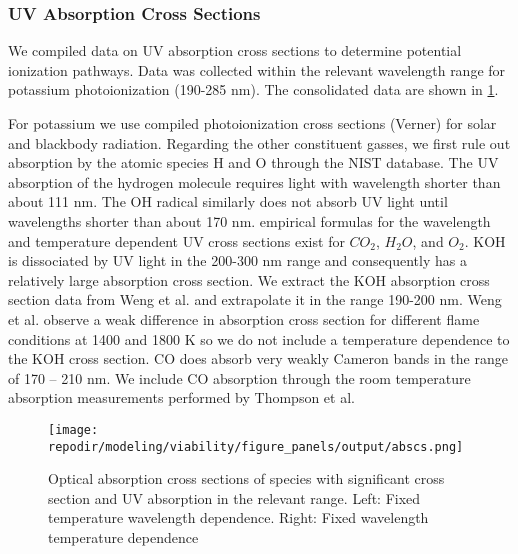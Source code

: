 \subsubsection{UV Absorption Cross Sections}

We compiled data on UV absorption cross sections to determine potential ionization pathways. Data was collected within the relevant wavelength range for potassium photoionization (190-285 nm). The consolidated data are shown in \ref{fig:SI_UV_abscs}.  

For potassium we use compiled photoionization cross sections (Verner) for solar and blackbody radiation.\cite{huebnerPhotoionizationPhotodissociationRates2015} Regarding the other constituent gasses, we first rule out absorption by the atomic species H and O through the NIST database.\cite{sansonettiHandbookBasicAtomic2005} The UV absorption of the hydrogen molecule requires light with wavelength shorter than about 111 nm.\cite{franceFARULTRAVIOLETMOLECULARHYDROGEN} The OH radical similarly does not absorb UV light until wavelengths shorter than about 170 nm.\cite{chipmanAbsorptionSpectrumOH2008} empirical formulas for the wavelength and temperature dependent UV cross sections exist for $CO_2$\cite{oehlschlaegerUltravioletAbsorptionCrosssections2004}, $H_2O$,\cite{zuevUVABSORPTIONCROSS} and $O_2$.\cite{zuevUVABSORPTIONCROSS} KOH is dissociated by UV light in the 200-300 nm range and consequently has a relatively large absorption cross section. We extract the KOH absorption cross section data from Weng et al. and extrapolate it in the range 190-200 nm.\cite{wengUltravioletAbsorptionCross2019} Weng et al. observe a weak difference in absorption cross section for different flame conditions at 1400 and 1800 K so we do not include a temperature dependence to the KOH cross section. CO does absorb very weakly Cameron bands in the range of 170 -- 210 nm. We include CO absorption through the room temperature absorption measurements performed by Thompson et al.\cite{thompsonUltravioletAbsorptionCoefficients1963}


\begin{figure}[h]
    \centering
    \texttt{[image: \\repodir/modeling/viability/figure\_panels/output/abscs.png]} 
    \caption{Optical absorption cross sections of species with significant cross section and UV absorption in the relevant range. Left: Fixed temperature wavelength dependence. Right: Fixed wavelength temperature dependence}
    \label{fig:SI_UV_abscs}
\end{figure}


